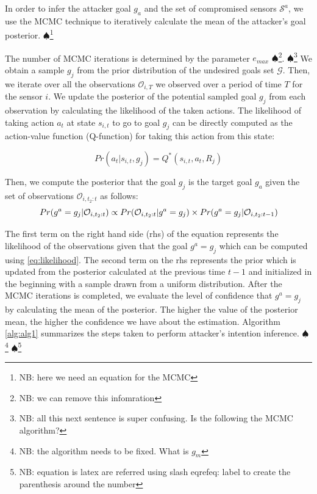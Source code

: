 \documentclass[letterpaper, 10 pt, conference]{ieeeconf}  %
\newcommand\NB[1]{$\spadesuit$\footnote{NB: #1}}
\begin{document}
In order to infer the attacker goal $g_a$ and the set of compromised sensors $\mathcal{S}^a$, we use the MCMC technique to iteratively calculate the mean of the attacker's goal posterior. \NB{here we need an equation for the MCMC}

The number of MCMC iterations is determined by the parameter ${e}_{max}$ \NB{we can remove this infomration}. \NB{all this next sentence is super confusing. Is the following the MCMC algorithm? } We obtain a sample $g_j$ from the prior distribution of the undesired goals set $\mathcal{G}$. Then, we iterate over all the observations $\mathcal{O}_{i,T}$ we observed over a period of time $T$ for the sensor $i$. We update the posterior of the potential sampled goal $g_j$ from each observation by calculating the likelihood of the taken actions. The likelihood of taking action $a_t$ at state $s_{i,t}$ to go to goal $g_j$ can be directly computed as the action-value function (Q-function) for taking this action from this state:

\begin{equation} Pr(a_t|s_{i,t},g_j) = Q^*(s_{i,t},a_t,R_j)
\label{eqn:action_likelihood}
\end{equation}


Then, we compute the posterior that the goal $g_j$ is the target goal $g_a$ given the set of observations $\mathcal{O}_{i,t_2:t}$ as follows:
\begin{equation} Pr(g^a=g_j|\mathcal{O}_{i,t_2:t}) \propto Pr(\mathcal{O}_{i,t_2:t} | g^a = g_j) \\ \times Pr(g^a=g_j|\mathcal{O}_{i,t_2:t-1})
\label{eqn:goal_posterior}
\end{equation}

The first term on the right hand side (rhs) of the equation represents the likelihood of the observations given that the goal $g^a=g_j$ which can be computed using \eqref{eq:likelihood}. The second term on the rhs represents the prior which is updated from the posterior calculated at the previous time $t-1$ and initialized in the beginning with a sample drawn from a uniform distribution.
After the MCMC iterations is completed, we evaluate the level of confidence that $g^a = g_j$ by calculating the mean of the posterior. The higher the value of the posterior mean, the higher the confidence we have about the estimation. Algorithm \ref{alg:alg1} summarizes the steps taken to perform attacker's intention inference. \NB{the algorithm needs to be fixed. What is $g_m$}
\NB{equation is latex are referred using slash eqref{eq: label} to create the parenthesis around the number }
\end{document}
